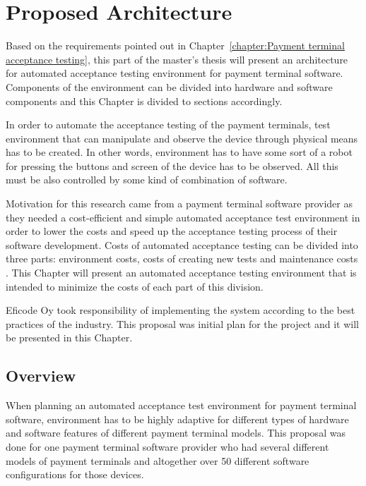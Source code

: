
\chapter{Proposed Architecture}
\label{chapter:Proposed architecture}

Based on the requirements pointed out in Chapter~\ref{chapter:Payment terminal acceptance testing}, this part of the master's thesis will present an architecture for automated acceptance testing environment for payment terminal software. Components of the environment can be divided into hardware and software components and this Chapter is divided to sections accordingly.

In order to automate the acceptance testing of the payment terminals, test environment that can manipulate and observe the device through physical means has to be created. In other words, environment has to have some sort of a robot for pressing the buttons and screen of the device has to be observed. All this must be also controlled by some kind of combination of software.

Motivation for this research came from a payment terminal software provider as they needed a cost-efficient and simple automated acceptance test environment in order to lower the costs and speed up the acceptance testing process of their software development. Costs of automated acceptance testing can be divided into three parts: environment costs, costs of creating new tests and maintenance costs \citep{laapas2014cost}. This Chapter will present an automated acceptance testing environment that is intended to minimize the costs of each part of this division.

Eficode Oy took responsibility of implementing the system according to the best practices of the industry. This proposal was initial plan for the project and it will be presented in this Chapter.

\section{Overview}

When planning an automated acceptance test environment for payment terminal software, environment has to be highly adaptive for different types of hardware and software features of different payment terminal models. This proposal was done for one payment terminal software provider who had several different models of payment terminals and altogether over 50 different software configurations for those devices.

